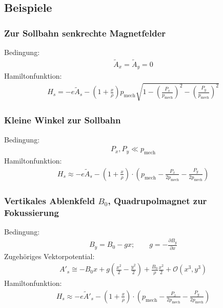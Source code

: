 \documentclass[hyperref={pdfpagelabels=false}]{beamer}
\begin{document}
\subsection{Beispiele}
\begin{frame}
\frametitle{Zur Sollbahn senkrechte Magnetfelder}
 \pause
 Bedingung:
 \begin{align*}
  \tilde {A}_x = \tilde{A}_y = 0
 \end{align*}
 Hamiltonfunktion:
 \begin{align*}
  H_s = -e\tilde{A}_s-\left(1+\frac{x}{\rho}\right)p_\text{mech}\sqrt{1-\left(\frac{P_x}{p_\text{mech}}\right)^2 -\left(\frac{P_y}{p_\text{mech}}\right)^2}
 \end{align*}
\end{frame}

\begin{frame}
 \frametitle{Kleine Winkel zur Sollbahn}
 Bedingung:
 \begin{align*}
  P_x, P_y \ll p_\text{mech} 
 \end{align*}
 Hamiltonfunktion:
 \begin{align*}
  H_s \approx -e\tilde{A}_s-\left(1+\frac{x}{\rho}\right)\cdot\left(p_\text{mech} - \frac{P_x}{2p_\text{mech}} - \frac{P_y}{2p_\text{mech}}\right)
 \end{align*}


\end{frame}

\begin{frame}
 \frametitle{Vertikales Ablenkfeld $B_0$, Quadrupolmagnet zur Fokussierung}
 \pause
 Bedingung:
 \begin{align*}
 B_y  = B_0 -gx; \qquad g = -\frac{\partial B_y}{\partial x}
 \end{align*}
 Zugehöriges Vektorpotential:
 \begin{align*}
  A'_s \cong -B_0 x + g\left(\frac{x^2}{2} - \frac{y^2}{2}\right) + \frac{B_0}{\rho}\frac{x^2}{2} + \mathcal{O}(x^3,y^3)
 \end{align*}
 Hamiltonfunktion:
 \begin{align*}
  H_s \approx -e\tilde{A}'_s-\left(1+\frac{x}{\rho}\right)\cdot\left(p_\text{mech} - \frac{P_x}{2p_\text{mech}} - \frac{P_y}{2p_\text{mech}}\right)
 \end{align*}

\end{frame}
\end{document}
